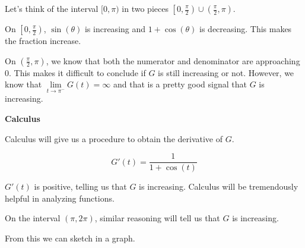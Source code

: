 \documentclass{ximera}
\begin{document}
Let's think of the interval $[0, \pi)$ in two pieces  $\left[ 0, \frac{\pi}{2} \right) \cup \left( \frac{\pi}{2}, \pi \right)$.


On $\left[ 0, \frac{\pi}{2} \right)$, $\sin(\theta)$ is increasing and $1 + \cos(\theta)$ is decreasing.  This makes the fraction increase.


On $\left( \frac{\pi}{2}, \pi \right)$, we know that both the numerator and denominator are approaching $0$.  This makes it difficult to conclude if $G$ is still increasing or not. However, we know that $\lim\limits_{t \to \pi^{-}}G(t) = \infty$ and that is a pretty good signal that $G$ is increasing.



\begin{remark} \textbf{\textcolor{purple!85!blue}{Calculus}}

Calculus will give us a procedure to obtain the derivative of $G$.


\[ G'(t)  = \frac{1}{1 + \cos(t)}    \]



$G'(t)$ is positive, telling us that $G$ is increasing.  Calculus will be tremendously helpful in analyzing functions.

\end{remark}




On the interval $(\pi, 2\pi)$, similar reasoning will tell us that $G$ is increasing. 


From this we can sketch in a graph.
\end{document}
